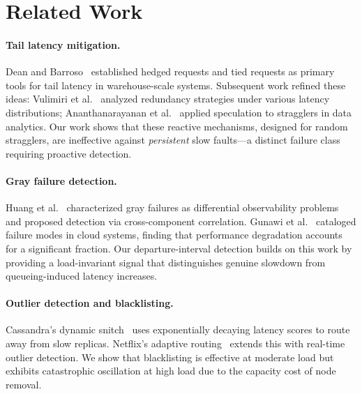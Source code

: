 \section{Related Work}
\label{sec:related}

\paragraph{Tail latency mitigation.}
Dean and Barroso~\cite{dean2013tail} established hedged requests and
tied requests as primary tools for tail latency in warehouse-scale
systems. Subsequent work refined these ideas: Vulimiri et
al.~\cite{vulimiri2013low} analyzed redundancy strategies under various
latency distributions; Ananthanarayanan et
al.~\cite{ananthanarayanan2013effective} applied speculation to
stragglers in data analytics. Our work shows that these reactive
mechanisms, designed for random stragglers, are ineffective against
\emph{persistent} slow faults---a distinct failure class requiring
proactive detection.

\paragraph{Gray failure detection.}
Huang et al.~\cite{huang2017gray} characterized gray failures as
differential observability problems and proposed detection via
cross-component correlation. Gunawi et al.~\cite{gunawi2018fail}
cataloged failure modes in cloud systems, finding that performance
degradation accounts for a significant fraction. Our departure-interval
detection builds on this work by providing a load-invariant signal that
distinguishes genuine slowdown from queueing-induced latency increases.

\paragraph{Outlier detection and blacklisting.}
Cassandra's dynamic snitch~\cite{lakshman2010cassandra} uses
exponentially decaying latency scores to route away from slow replicas.
Netflix's adaptive routing~\cite{netflix2020zuul} extends this with
real-time outlier detection. We show that blacklisting is effective at
moderate load but exhibits catastrophic oscillation at high load due to
the capacity cost of node removal.

